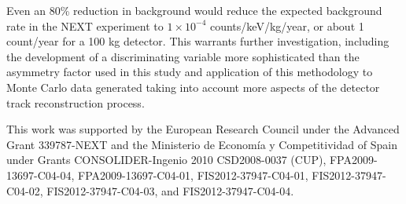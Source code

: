 \documentclass{JINST}
\begin{document}
Even an 80\% reduction in background would reduce the expected background rate in the NEXT experiment to
$1 \times 10^{-4}$ counts/keV/kg/year, or about 1 count/year for a 100 kg detector.  This warrants further
investigation, including the development of a discriminating variable more sophisticated than the asymmetry 
factor used in this study and application of this methodology to Monte Carlo data generated taking into account 
more aspects of the detector track reconstruction process.

\acknowledgments

This work was supported by the European Research Council under the Advanced Grant 339787-NEXT and the Ministerio de Econom\'{i}a y Competitividad of Spain under Grants CONSOLIDER-Ingenio 2010 CSD2008-0037 (CUP), FPA2009-13697-C04-04, FPA2009-13697-C04-01, FIS2012-37947-C04-01, FIS2012-37947-C04-02, FIS2012-37947-C04-03, and FIS2012-37947-C04-04.



\end{document}
